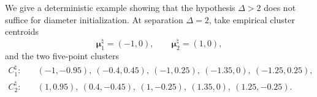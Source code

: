 \documentclass{article}
\theoremstyle{plain}
\theoremstyle{definition}
\newcommand{\1}{\mathbf{1}}
\newcommand{\hmu}{\bm{\mu}^\natural}
\newcommand{\bmu}{\bm{\mu}}
\begin{document}
We give a deterministic example showing that the hypothesis $\Delta>2$ does not suffice for diameter initialization.
At separation $\Delta=2$, take empirical cluster centroids
\[
\hmu_1=(-1,0),
\qquad
\hmu_2=(1,0),
\]
and the two five-point clusters
\begin{align*}
C_1^\natural:
&\quad
(-1,-0.95),\ (-0.4,0.45),\ (-1,0.25),\ (-1.35,0),\ (-1.25,0.25),\\
C_2^\natural:
&\quad
(1,0.95),\ (0.4,-0.45),\ (1,-0.25),\ (1.35,0),\ (1.25,-0.25).
\end{align*}


\end{document}
